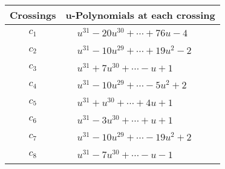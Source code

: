 \documentclass[1p]{elsarticle_modified}
\theoremstyle{definition}
\begin{document}
\begin{tabular}{m{50pt}|m{274pt}}
Crossings & \hspace{64pt}u-Polynomials at each crossing \\
\hline $$\begin{aligned}c_{1}\end{aligned}$$&$\begin{aligned}
&u^{31}-20 u^{30}+\cdots+76 u-4
\end{aligned}$\\
\hline $$\begin{aligned}c_{2}\end{aligned}$$&$\begin{aligned}
&u^{31}-10 u^{29}+\cdots+19 u^2-2
\end{aligned}$\\
\hline $$\begin{aligned}c_{3}\end{aligned}$$&$\begin{aligned}
&u^{31}+7 u^{30}+\cdots- u+1
\end{aligned}$\\
\hline $$\begin{aligned}c_{4}\end{aligned}$$&$\begin{aligned}
&u^{31}-10 u^{29}+\cdots-5 u^2+2
\end{aligned}$\\
\hline $$\begin{aligned}c_{5}\end{aligned}$$&$\begin{aligned}
&u^{31}+u^{30}+\cdots+4 u+1
\end{aligned}$\\
\hline $$\begin{aligned}c_{6}\end{aligned}$$&$\begin{aligned}
&u^{31}-3 u^{30}+\cdots+u+1
\end{aligned}$\\
\hline $$\begin{aligned}c_{7}\end{aligned}$$&$\begin{aligned}
&u^{31}-10 u^{29}+\cdots-19 u^2+2
\end{aligned}$\\
\hline $$\begin{aligned}c_{8}\end{aligned}$$&$\begin{aligned}
&u^{31}-7 u^{30}+\cdots- u-1
\end{aligned}$\\

\end{tabular}
\end{document}
